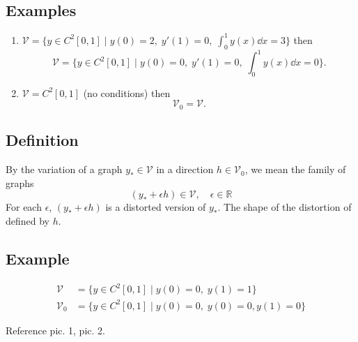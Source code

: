 \documentclass[12pt,twoside]{article}
\begin{document}
\subsection{Examples}
\begin{enumerate}
\item $\mathcal{V}=\{y\in C^2[0,1]\;|\;y(0)=2,\; y'(1)=0,\; \int_0^1 y(x)\dd{x}=3\}$
  then
  \begin{equation*}
    \mathcal{V} = \{y\in C^2[0,1]\;|\;y(0)=0,\; y'(1)=0,\;\int_0^1y(x)\dd{x}=0\}.
  \end{equation*}
\item $\mathcal{V}=C^2[0,1]$ (no conditions)
  then $$\mathcal{V}_0=\mathcal{V}.$$
\end{enumerate}

\subsection{Definition}
By the variation of a graph $y_*\in\mathcal{V}$ in a direction
$h\in\mathcal{V}_0$, we mean the family of graphs
$$(y_*+\epsilon h)\in\mathcal{V},\quad \epsilon\in\mathbb{R}$$
For each $\epsilon$, $(y_*+\epsilon h)$ is a distorted version of $y_*$. The
shape of the distortion of defined by $h$.

\subsection{Example}
\begin{equation*}
  \begin{aligned}
    \mathcal{V} &= \{y\in C^2[0,1]\;|\;y(0)=0,\;y(1)=1\} \\
    \mathcal{V}_0 &= \{y\in C^2[0,1]\;|\;y(0)=0,\;y(0)=0,y(1)=0\}
  \end{aligned}
\end{equation*}
\begin{figure}[ht]
  \centering
  \caption{}
  \label{fig:y-star-in-v}
\end{figure}
Reference pic. 1, pic. 2.
\end{document}
